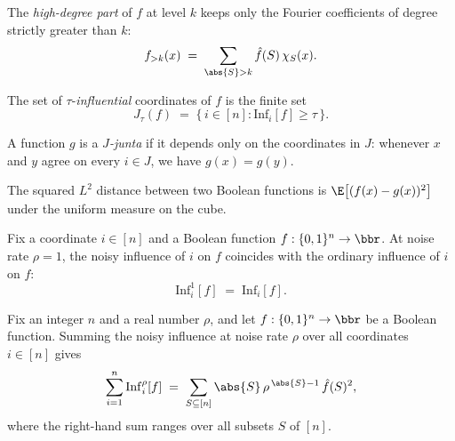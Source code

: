 \begin{definition}
\label{KKL.highDegreePart}
\leanok
{}
The \emph{high-degree part} of $f$ at level $k$ keeps only the Fourier coefficients
of degree strictly greater than $k$:
\[
  f_{>k}(x) \;=\; \sum_{\abs{S} > k} \hat f(S)\,\chi_S(x).
\]
\end{definition}

\begin{definition}
\label{KKL.influentialCoords}
\leanok
{}
The set of $\tau$-\emph{influential} coordinates of $f$ is the finite set
\[
  J_\tau(f) \;=\; \{\, i \in [n] : \mathrm{Inf}_i[f] \ge \tau \,\}.
\]
\end{definition}

\begin{definition}[Junta]
\label{KKL.IsJunta}
\leanok
{}
A function $g$ is a \emph{$J$-junta} if it depends only on the coordinates in $J$:
whenever $x$ and $y$ agree on every $i \in J$, we have $g(x) = g(y)$.
\end{definition}

\begin{definition}
\label{KKL.l2DistSq}
\leanok
{}
The squared $L^2$ distance between two Boolean functions is
$\E\big[(f(x) - g(x))^2\big]$ under the uniform measure on the cube.
\end{definition}

\begin{lemma}
\label{KKL.noisyInfluence_one}
\leanok
{}
Fix a coordinate $i \in [n]$ and a Boolean function $f:\{0,1\}^n\to\bbr$. At noise rate
$\rho = 1$, the noisy influence of $i$ on $f$ coincides with the ordinary influence of
$i$ on $f$:
\[
  \mathrm{Inf}_i^{1}[f] \;=\; \mathrm{Inf}_i[f].
\]
\end{lemma}

\begin{lemma}
\label{KKL.sum_noisyInfluence}
\leanok
{}
Fix an integer $n$ and a real number $\rho$, and let $f:\{0,1\}^n\to\bbr$ be a Boolean
function. Summing the noisy influence at noise rate $\rho$ over all coordinates
$i\in[n]$ gives
\[
  \sum_{i=1}^{n} \mathrm{Inf}_i^{\rho}[f]
  \;=\; \sum_{S\subseteq[n]} \abs{S}\,\rho^{\,\abs{S}-1}\,\hat f(S)^2,
\]
where the right-hand sum ranges over all subsets $S$ of $[n]$.
\end{lemma}

